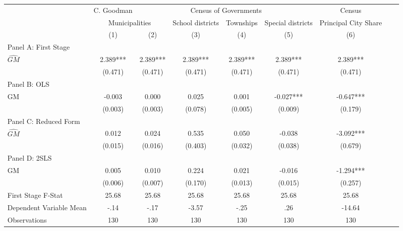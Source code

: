  \begin{tabular}{l*{8}{c}} \toprule
&\multicolumn{1}{c}{C. Goodman}&\multicolumn{4}{c}{Census of Governments}&\multicolumn{1}{c}{Census}\\\cmidrule(lr){2-2}\cmidrule(lr){3-6}\cmidrule(lr){7-7}
&\multicolumn{2}{c}{Municipalities}&\multicolumn{1}{c}{School districts}&\multicolumn{1}{c}{Townships}&\multicolumn{1}{c}{Special districts}&\multicolumn{1}{c}{Principal City Share}\\\cmidrule(lr){2-3}\cmidrule(lr){4-6}\cmidrule(lr){7-7}
&\multicolumn{1}{c}{(1)}&\multicolumn{1}{c}{(2)}&\multicolumn{1}{c}{(3)}&\multicolumn{1}{c}{(4)}&\multicolumn{1}{c}{(5)}&\multicolumn{1}{c}{(6)}\\
\cmidrule(lr){1-7}
\multicolumn{6}{l}{Panel A: First Stage}\\
\cmidrule(lr){1-7}
$\widehat{GM}$  &    2.389***&    2.389***&    2.389***&    2.389***&    2.389***&    2.389***\\
                &  (0.471)   &  (0.471)   &  (0.471)   &  (0.471)   &  (0.471)   &  (0.471)   \\
\cmidrule(lr){1-7}
\multicolumn{6}{l}{Panel B: OLS}\\
\cmidrule(lr){1-7}
GM              &   -0.003   &    0.000   &    0.025   &    0.001   &   -0.027***&   -0.647***\\
                &  (0.003)   &  (0.003)   &  (0.078)   &  (0.005)   &  (0.009)   &  (0.179)   \\
\cmidrule(lr){1-7}
\multicolumn{6}{l}{Panel C: Reduced Form}\\
\cmidrule(lr){1-7}
$\widehat{GM}$  &    0.012   &    0.024   &    0.535   &    0.050   &   -0.038   &   -3.092***\\
                &  (0.015)   &  (0.016)   &  (0.403)   &  (0.032)   &  (0.038)   &  (0.679)   \\
\cmidrule(lr){1-7}
\multicolumn{6}{l}{Panel D: 2SLS}\\
\cmidrule(lr){1-7}
GM              &    0.005   &    0.010   &    0.224   &    0.021   &   -0.016   &   -1.294***\\
                &  (0.006)   &  (0.007)   &  (0.170)   &  (0.013)   &  (0.015)   &  (0.257)   \\
\midrule
First Stage F-Stat&    25.68   &    25.68   &    25.68   &    25.68   &    25.68   &    25.68   \\
Dependent Variable Mean&     -.14   &     -.17   &    -3.57   &     -.25   &      .26   &   -14.64   \\
Observations    &      130   &      130   &      130   &      130   &      130   &      130   \\
       \bottomrule \end{tabular}
